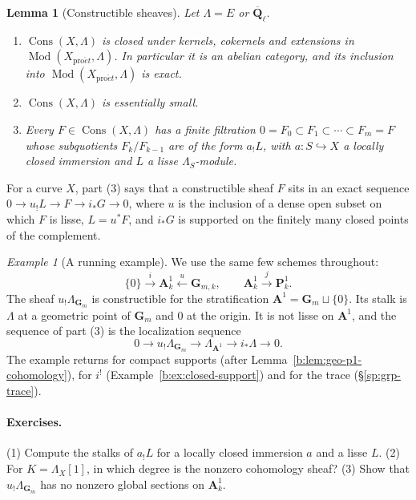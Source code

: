 \documentclass[11pt,a4paper]{article}
\numberwithin{equation}{section}
\newtheorem{lemma}[theorem]{Lemma}
\theoremstyle{definition}
\theoremstyle{remark}
\newcommand{\Mod}{\operatorname{Mod}}
\newcommand{\Qbar}{\overline{\mathbf Q}_\ell}
\newcommand{\proet}{\mathrm{pro}\acute{e}t}
\newcommand{\Cons}{\operatorname{Cons}}
\newtheorem{example}[theorem]{Example}
\begin{document}
\begin{lemma}[Constructible sheaves]
\label{b:lem:coefficient-heart}
Let $\Lambda=E$ or $\Qbar$.
\begin{enumerate}
\item $\Cons(X,\Lambda)$ is closed under kernels, cokernels and
  extensions in $\Mod(X_{\proet},\Lambda)$. In particular it is an abelian
  category, and its inclusion into $\Mod(X_{\proet},\Lambda)$ is exact.
\item $\Cons(X,\Lambda)$ is essentially small.
\item Every $F\in\Cons(X,\Lambda)$ has a finite filtration
  $0=F_0\subset F_1\subset\cdots\subset F_m=F$ whose subquotients
  $F_k/F_{k-1}$ are of the form $a_!L$, with $a:S\hookrightarrow X$ a
  locally closed immersion and $L$ a lisse $\Lambda_S$-module.
\end{enumerate}
\end{lemma}
For a curve $X$, part (3) says that a constructible sheaf $F$ sits in an
exact sequence $0\to u_!L\to F\to i_*G\to0$, where $u$ is the inclusion
of a dense open subset on which $F$ is lisse, $L=u^*F$, and $i_*G$ is
supported on the finitely many closed points of the complement.

\begin{example}[A running example]\label{b:ex:running}
We use the same few schemes throughout:
\[
 \{0\}\xrightarrow{\ i\ }\mathbf A^1_k\xleftarrow{\ u\ }\mathbf G_{m,k},
 \qquad \mathbf A^1_k\xrightarrow{\ j\ }\mathbf P^1_k .
\]
The sheaf $u_!\Lambda_{\mathbf G_m}$ is constructible for the
stratification $\mathbf A^1=\mathbf G_m\sqcup\{0\}$. Its stalk is
$\Lambda$ at a geometric point of $\mathbf G_m$ and $0$ at the origin.
It is not lisse on $\mathbf A^1$, and the sequence of part (3) is the
localization sequence
\[
 0\to u_!\Lambda_{\mathbf G_m}\to\Lambda_{\mathbf A^1}\to i_*\Lambda\to0 .
\]
The example returns for compact supports (after
Lemma~\ref{b:lem:geo-p1-cohomology}), for $i^!$ (Example~\ref{b:ex:closed-support}) and
for the trace (\S\ref{sp:grp-trace}).
\end{example}

\paragraph*{Exercises.} (1) Compute the stalks of $a_!L$ for a locally
closed immersion $a$ and a lisse $L$. (2) For $K=\Lambda_X[1]$, in
which degree is the nonzero cohomology sheaf? (3) Show that
$u_!\Lambda_{\mathbf G_m}$ has no nonzero global sections on
$\mathbf A^1_k$.
\end{document}
